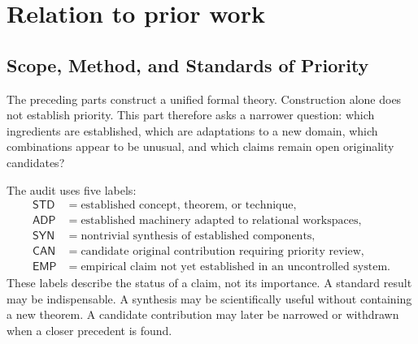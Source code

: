 

\chapter{Relation to prior work}\label{SRWT:book:chapter-89}


\section{Scope, Method, and Standards of Priority}


The preceding parts construct a unified formal theory. Construction alone does
not establish priority. This part therefore asks a narrower question:
which ingredients are established, which are adaptations to a new domain,
which combinations appear to be unusual, and which claims remain open originality candidates?

The audit uses five labels:
\[
\begin{array}{ll}
\mathsf{STD} & = \text{established concept, theorem, or technique},\\
\mathsf{ADP} & = \text{established machinery adapted to relational workspaces},\\
\mathsf{SYN} & = \text{nontrivial synthesis of established components},\\
\mathsf{CAN} & = \text{candidate original contribution requiring priority review},\\
\mathsf{EMP} & = \text{empirical claim not yet established in an uncontrolled system}.
\end{array}
\]
These labels describe the status of a claim, not its importance. A standard
result may be indispensable. A synthesis may be scientifically useful without
containing a new theorem. A candidate contribution may later be narrowed or
withdrawn when a closer precedent is found.


